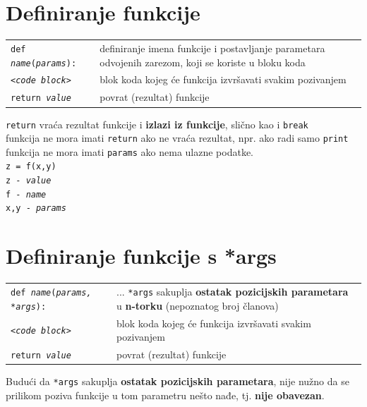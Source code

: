 \documentclass[10pt]{article}
\begin{document}
    \section*{\color{NavyBlue} Definiranje funkcije}
    \begin{tabular}{|>{\tt}p{9.00cm}|>{}p{15.50cm}|}
        \hline
        def \textit{name}(\textit{params}): & definiranje imena funkcije i postavljanje parametara odvojenih zarezom, koji se koriste u bloku koda
        \\
        \hspace{5mm}\textit{<code block}> & blok koda kojeg će funkcija izvršavati svakim pozivanjem
        \\
        \hspace{5mm}return \textit{value} & povrat (rezultat) funkcije
        \\ \hline
    \end{tabular}
    \begin{center}
        \footnotesize
        \texttt{return} vraća rezultat funkcije i \textbf{izlazi iz funkcije}, slično kao i \texttt{break} \\
        funkcija ne mora imati \texttt{return} ako ne vraća rezultat, npr. ako radi samo \texttt{print} \\
        funkcija ne mora imati \texttt{params} ako nema ulazne podatke. \\
        \texttt{z = f(x,y)} \\
        \texttt{z - \textit{value}} \\
        \texttt{f - \textit{name}} \\
        \texttt{x,y - \textit{params}} \\
    \end{center}

    \section*{\color{NavyBlue} Definiranje funkcije s *args}
    \begin{tabular}{|>{\tt}p{9.00cm}|>{}p{15.50cm}|}
        \hline
        def \textit{name}(\textit{params, *args}): & ... \texttt{*args} sakuplja \textbf{ostatak pozicijskih parametara} u \textbf{n-torku} (nepoznatog broj članova)
        \\
        \hspace{5mm}\textit{<code block}> & blok koda kojeg će funkcija izvršavati svakim pozivanjem
        \\
        \hspace{5mm}return \textit{value} & povrat (rezultat) funkcije
        \\ \hline
    \end{tabular}
    \begin{center}
        \footnotesize
        Budući da \texttt{*args} sakuplja \textbf{ostatak pozicijskih parametara}, nije nužno da se prilikom poziva funkcije u tom parametru nešto nađe, tj. \textbf{nije obavezan}.
    \end{center}
\end{document}

